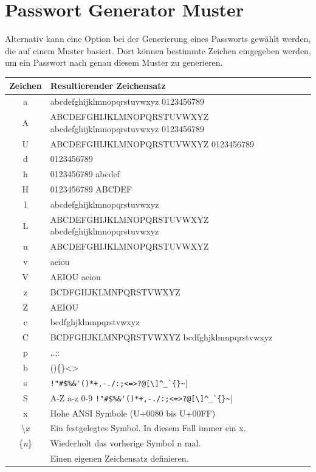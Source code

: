 \documentclass[12pt,a4paper]{scrreprt}
\begin{document}
\newpage

\section{Passwort Generator Muster}

\noindent Alternativ kann eine Option bei der Generierung eines Passworts gewählt werden, die auf einem Muster basiert. Dort können bestimmte Zeichen eingegeben werden, um ein Passwort nach genau diesem Muster zu generieren.

\begin{center}
\begin{tabular}{|c|l|}
Zeichen&Resultierender Zeichensatz\\ \hline
a&abcdefghijklmnopqrstuvwxyz 0123456789\\
A&ABCDEFGHIJKLMNOPQRSTUVWXYZ abcdefghijklmnopqrstuvwxyz 0123456789\\
U&ABCDEFGHIJKLMNOPQRSTUVWXYZ 0123456789\\
d&0123456789\\
h&0123456789 abcdef\\
H&0123456789 ABCDEF\\
l&abcdefghijklmnopqrstuvwxyz\\
L&ABCDEFGHIJKLMNOPQRSTUVWXYZ abcdefghijklmnopqrstuvwxyz\\
u&ABCDEFGHIJKLMNOPQRSTUVWXYZ\\
v&aeiou\\
V&AEIOU aeiou\\
z&BCDFGHJKLMNPQRSTVWXYZ\\
Z&AEIOU\\
c&bcdfghjklmnpqrstvwxyz\\
C&BCDFGHJKLMNPQRSTVWXYZ bcdfghjklmnpqrstvwxyz\\
p&,.;:\\
b&()\big[\big]\{{}\}{}<>\\
s&\verb|!"#$%&'()*+,-./:;<=>?@[\]^_`{}~|| \\
S&A-Z a-z 0-9 \verb|!"#$%&'()*+,-./:;<=>?@[\]^_`{}~||\\
x&Hohe ANSI Symbole (U+0080 bis U+00FF)\\
\textbackslash{}\textit{x}&Ein festgelegtes Symbol. In diesem Fall immer ein x.\\
\{{}\textit{n}\}{}&Wiederholt das vorherige Symbol n mal.\\
\big[...\big]&Einen eigenen Zeichensatz definieren.\\
\end{tabular}
\end{center}
\end{document}
